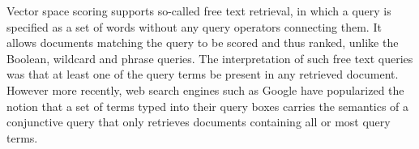\documentclass[letterpaper,11pt]{article}
\begin{document}
Vector space scoring supports so-called free text retrieval, in which a query is specified as a set of words without any query operators connecting them. It allows documents matching the query to be scored and thus ranked, unlike the Boolean, wildcard and phrase queries. The interpretation of such free text queries was that at least one of the query terms be present in any retrieved document. However more recently, web search engines such as Google have popularized the notion that a set of terms typed into their query boxes carries the semantics of a conjunctive query that only retrieves documents containing all or most query terms.



\end{document}
